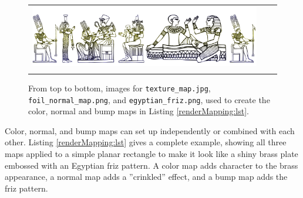 \begin{figure}[ht]
\begin{center}
\begin{tabular}{ccc}
         \includegraphics[width=4.5in]{images/egyptian_friz}\\
      \fi
   \end{tabular}
\end{center}
\caption{From top to bottom, images for 
{\tt texture\_map.jpg}, 
{\tt foil\_normal\_map.png}, and
{\tt egyptian\_friz.png}, 
used to create the color, normal and bump maps
in Listing \ref{renderMapping:lst}.}
\label{rawMappingImages:fig}
\end{figure}

Color, normal, and bump maps can set up independently or combined
with each other.  Listing \ref{renderMapping:lst} gives a complete
example, showing all three maps applied to a simple planar rectangle
to make it look like a shiny brass plate embossed with an Egyptian
friz pattern. A color map adds character to the brass appearance, a
normal map adds a ''crinkled'' effect, and a bump map adds the friz
pattern.


